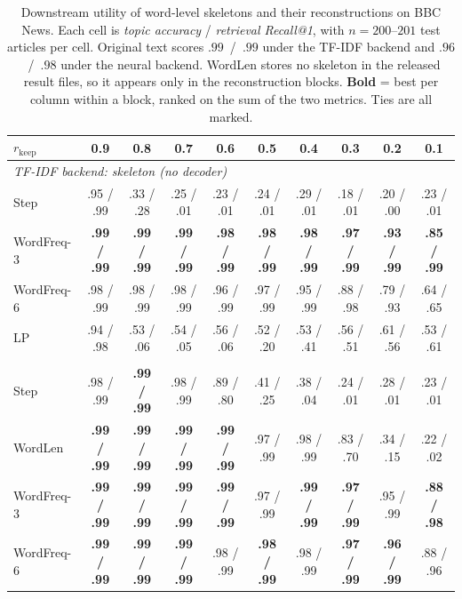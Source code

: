 \documentclass[11pt]{article}
\newcommand{\rkeep}{r_{\mathrm{keep}}}
\begin{document}
\begin{table}[tbp]
\centering
\small
\setlength{\tabcolsep}{5pt}
\caption{Downstream utility of word-level skeletons and their reconstructions on BBC News. Each cell is
\emph{topic accuracy} / \emph{retrieval Recall@1}, with $n{=}200$--$201$ test articles per cell. Original text
scores $.99$~/~$.99$ under the TF-IDF backend and $.96$~/~$.98$ under the neural backend. WordLen stores no
skeleton in the released result files, so it appears only in the reconstruction blocks. \textbf{Bold} = best
per column within a block, ranked on the sum of the two metrics. Ties are all marked.}
\label{tab:downstream}
\begin{tabular}{l ccccccccc}
\toprule
$\rkeep$ & 0.9 & 0.8 & 0.7 & 0.6 & 0.5 & 0.4 & 0.3 & 0.2 & 0.1 \\
\midrule
\multicolumn{10}{l}{\emph{TF-IDF backend: skeleton (no decoder)}} \\
Step         & .95 / .99 & .33 / .28 & .25 / .01 & .23 / .01 & .24 / .01 & .29 / .01 & .18 / .01 & .20 / .00 & .23 / .01 \\
WordFreq-3   & \textbf{.99 / .99} & \textbf{.99 / .99} & \textbf{.99 / .99} & \textbf{.98 / .99} & \textbf{.98 / .99} & \textbf{.98 / .99} & \textbf{.97 / .99} & \textbf{.93 / .99} & \textbf{.85 / .99} \\
WordFreq-6   & .98 / .99 & .98 / .99 & .98 / .99 & .96 / .99 & .97 / .99 & .95 / .99 & .88 / .98 & .79 / .93 & .64 / .65 \\
LP           & .94 / .98 & .53 / .06 & .54 / .05 & .56 / .06 & .52 / .20 & .53 / .41 & .56 / .51 & .61 / .56 & .53 / .61 \\
\addlinespace[2pt]
\multicolumn{10}{l}{\emph{TF-IDF backend: reconstruction}} \\
Step         & .98 / .99 & \textbf{.99 / .99} & .98 / .99 & .89 / .80 & .41 / .25 & .38 / .04 & .24 / .01 & .28 / .01 & .23 / .01 \\
WordLen      & \textbf{.99 / .99} & \textbf{.99 / .99} & \textbf{.99 / .99} & \textbf{.99 / .99} & .97 / .99 & .98 / .99 & .83 / .70 & .34 / .15 & .22 / .02 \\
WordFreq-3   & \textbf{.99 / .99} & \textbf{.99 / .99} & \textbf{.99 / .99} & \textbf{.99 / .99} & .97 / .99 & \textbf{.99 / .99} & \textbf{.97 / .99} & .95 / .99 & \textbf{.88 / .98} \\
WordFreq-6   & \textbf{.99 / .99} & \textbf{.99 / .99} & \textbf{.99 / .99} & .98 / .99 & \textbf{.98 / .99} & .98 / .99 & \textbf{.97 / .99} & \textbf{.96 / .99} & .88 / .96 \\

\end{tabular}
\end{table}
\end{document}
